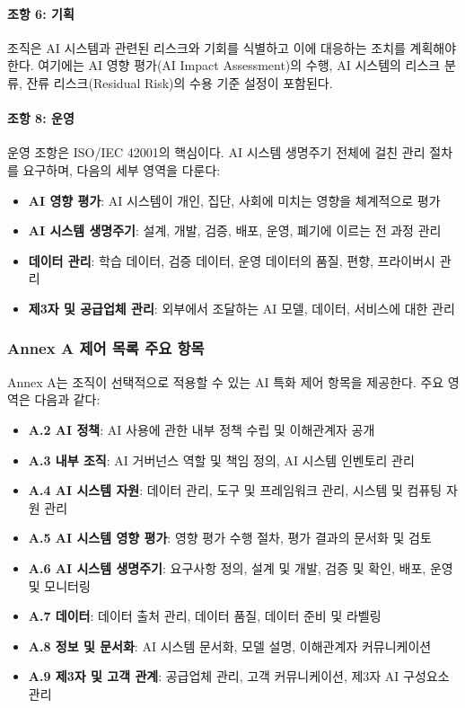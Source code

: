 \paragraph{조항 6: 기획}
조직은 AI 시스템과 관련된 리스크와 기회를 식별하고 이에 대응하는 조치를 계획해야 한다. 여기에는 AI 영향 평가(AI Impact Assessment)의 수행, AI 시스템의 리스크 분류, 잔류 리스크(Residual Risk)의 수용 기준 설정이 포함된다.

\paragraph{조항 8: 운영}
운영 조항은 ISO/IEC 42001의 핵심이다. AI 시스템 생명주기 전체에 걸친 관리 절차를 요구하며, 다음의 세부 영역을 다룬다:
\begin{itemize}
 \item \textbf{AI 영향 평가}: AI 시스템이 개인, 집단, 사회에 미치는 영향을 체계적으로 평가
 \item \textbf{AI 시스템 생명주기}: 설계, 개발, 검증, 배포, 운영, 폐기에 이르는 전 과정 관리
 \item \textbf{데이터 관리}: 학습 데이터, 검증 데이터, 운영 데이터의 품질, 편향, 프라이버시 관리
 \item \textbf{제3자 및 공급업체 관리}: 외부에서 조달하는 AI 모델, 데이터, 서비스에 대한 관리
\end{itemize}

\subsubsection{Annex A 제어 목록 주요 항목}

Annex A는 조직이 선택적으로 적용할 수 있는 AI 특화 제어 항목을 제공한다. 주요 영역은 다음과 같다:

\begin{itemize}
 \item \textbf{A.2 AI 정책}: AI 사용에 관한 내부 정책 수립 및 이해관계자 공개
 \item \textbf{A.3 내부 조직}: AI 거버넌스 역할 및 책임 정의, AI 시스템 인벤토리 관리
 \item \textbf{A.4 AI 시스템 자원}: 데이터 관리, 도구 및 프레임워크 관리, 시스템 및 컴퓨팅 자원 관리
 \item \textbf{A.5 AI 시스템 영향 평가}: 영향 평가 수행 절차, 평가 결과의 문서화 및 검토
 \item \textbf{A.6 AI 시스템 생명주기}: 요구사항 정의, 설계 및 개발, 검증 및 확인, 배포, 운영 및 모니터링
 \item \textbf{A.7 데이터}: 데이터 출처 관리, 데이터 품질, 데이터 준비 및 라벨링
 \item \textbf{A.8 정보 및 문서화}: AI 시스템 문서화, 모델 설명, 이해관계자 커뮤니케이션
 \item \textbf{A.9 제3자 및 고객 관계}: 공급업체 관리, 고객 커뮤니케이션, 제3자 AI 구성요소 관리
\end{itemize}

